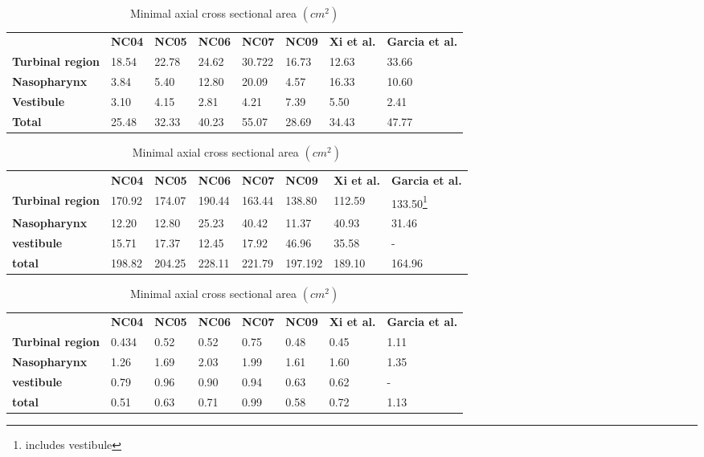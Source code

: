 \begin{table}
\begin{tabular}{llllllll}
 & \textbf{NC04} & \textbf{NC05} & \textbf{NC06} & \textbf{NC07} & \textbf{NC09} &\textbf{Xi et al.\cite{Xi2012}} & \textbf{Garcia et al.\cite{Garcia2007}} \\
\cline{2-8}
\textbf{Turbinal region} & 18.54 & 22.78 & 24.62 & 30.722 & 16.73 & 12.63 & 33.66\\
\textbf{Nasopharynx}  & 3.84 & 5.40 & 12.80 & 20.09 & 4.57 & 16.33 & 10.60\\
\textbf{Vestibule} & 3.10 & 4.15 & 2.81 & 4.21 & 7.39 & 5.50 & 2.41\\
\textbf{Total} & 25.48 & 32.33 & 40.23 & 55.07 & 28.69 & 34.43 & 47.77 \\
\hline
\end{tabular}
\caption{ sectional volume, according to sections as seen in Figure \ref{fig:regions} ($ cm^3 $)}\label{tab:secvol}
\begin{tabular}{llllllll}
 & \textbf{NC04} & \textbf{NC05} & \textbf{NC06} & \textbf{NC07} &\textbf{NC09}& \textbf{Xi et al.} & \textbf{Garcia et al.}\\
 \cline{2-8}
\textbf{Turbinal region} & 170.92 & 174.07& 190.44 & 163.44 & 138.80 & 112.59 & 133.50\footnote{includes vestibule} \\
\textbf{Nasopharynx} & 12.20 & 12.80 & 25.23 & 40.42 & 11.37 & 40.93 & 31.46\\
\textbf{vestibule} & 15.71 & 17.37 & 12.45 & 17.92 & 46.96 & 35.58 &  -\\
\textbf{total} & 198.82 & 204.25 & 228.11 & 221.79 & 197.192 & 189.10 & 164.96\\
\hline
\end{tabular}
\caption{sectional surface area, according to sections shown in Figure \ref{fig:regions}($ cm^2 $)}\label{tab:secsa}
\begin{tabular}{llllllll}
& \textbf{NC04}  & \textbf{NC05} & \textbf{NC06} & \textbf{NC07} & \textbf{NC09} & \textbf{Xi et al.} & \textbf{Garcia et al.}\\
 \cline{2-8}
\textbf{Turbinal region} & 0.434 & 0.52 & 0.52 & 0.75 & 0.48 & 0.45 & 1.11\\
\textbf{Nasopharynx} & 1.26 & 1.69 & 2.03 & 1.99 & 1.61 & 1.60 & 1.35\\
\textbf{vestibule} & 0.79 & 0.96 & 0.90 & 0.94 & 0.63 & 0.62 &  - \\
\textbf{total} & 0.51 & 0.63 & 0.71 & 0.99 & 0.58 & 0.72 & 1.13 \\
\hline
\end{tabular}
\caption{Effective diameter $d_{eff} = \frac{4v}{a} (cm) $}\label{tab:deff}
\centering

\caption{Minimal axial cross sectional area $(cm^2)$}\label{tab:mca}
\end{table}

